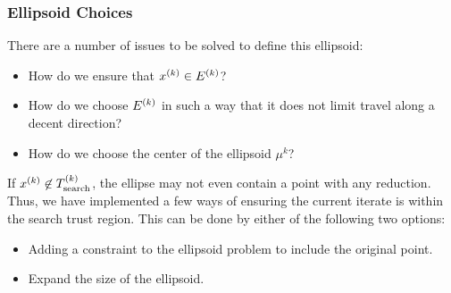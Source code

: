  








\subsubsection{Ellipsoid Choices}

There are a number of issues to be solved to define this ellipsoid:
\begin{itemize}
\item How do we ensure that ${x}^{(k)} \in {E^{(k)}} $?
\item How do we choose ${E^{(k)}}$ in such a way that it does not limit travel along a decent direction?
\item How do we choose the center of the ellipsoid $\mu^k$?
\end{itemize}


If ${x}^{(k)} \not \in {T_{\text{search}}^{(k)}} $, the ellipse may not even contain a point with any reduction.
Thus, we have implemented a few ways of ensuring the current iterate is within the search trust region.
This can be done by either of the following two options:
\begin{itemize}
\item Adding a constraint to the ellipsoid problem to include the original point.
\item Expand the size of the ellipsoid.
\end{itemize}

